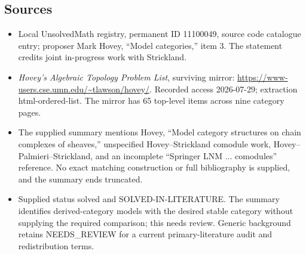 \documentclass[11pt]{article}
\begin{document}
\subsection{Sources}
\begin{itemize}
\item Local UnsolvedMath registry, permanent ID 11100049, source code catalogue entry; proposer Mark Hovey, ``Model categories,'' item 3. The statement credits joint in-progress work with Strickland.
\item \emph{Hovey's Algebraic Topology Problem List}, surviving mirror: \url{https://www-users.cse.umn.edu/~tlawson/hovey/}. Recorded access 2026-07-29; extraction html-ordered-list. The mirror has 65 top-level items across nine category pages.
\item The supplied summary mentions Hovey, ``Model category structures on chain complexes of sheaves,'' unspecified Hovey--Strickland comodule work, Hovey--Palmieri--Strickland, and an incomplete ``Springer LNM ... comodules'' reference. No exact matching construction or full bibliography is supplied, and the summary ends truncated.
\item Supplied status solved and SOLVED-IN-LITERATURE. The summary identifies derived-category models with the desired stable category without supplying the required comparison; this needs review. Generic background retains NEEDS\_REVIEW for a current primary-literature audit and redistribution terms.
\end{itemize}
\end{document}
